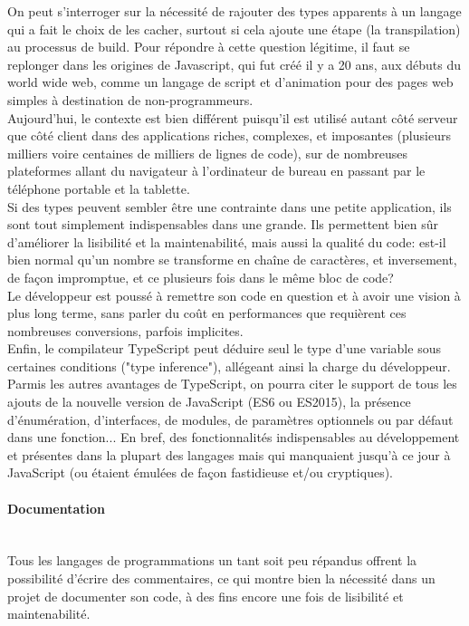 \documentclass[a4paper,french,12pt]{article}
\begin{document}
On peut s'interroger sur la nécessité de rajouter des types apparents à un langage qui a fait le choix de les cacher, surtout si cela ajoute une étape (la transpilation) au processus de build. Pour répondre à cette question légitime, il faut se replonger dans les origines de Javascript, qui fut créé il y a 20 ans, aux débuts du world wide web, comme un langage de script et d'animation pour des pages web simples à destination de non-programmeurs.~\\

	Aujourd'hui, le contexte est bien différent puisqu'il est utilisé autant côté serveur que côté client dans des applications riches, complexes, et imposantes (plusieurs milliers voire centaines de milliers de lignes de code), sur de nombreuses plateformes allant du navigateur à l'ordinateur de bureau en passant par le téléphone portable et la tablette.~\\
	
	Si des types peuvent sembler être une contrainte dans une petite application, ils sont tout simplement indispensables dans une grande.
	Ils permettent bien sûr d'améliorer la lisibilité et la maintenabilité, 
	mais aussi la qualité du code: est-il bien normal qu'un nombre se transforme en chaîne de caractères, et inversement, de façon impromptue, et ce plusieurs fois dans le même bloc de code? ~\\
	
	Le développeur est poussé à remettre son code en question et à avoir une vision à plus long terme, sans parler du coût en performances que requièrent ces nombreuses conversions, parfois implicites.~\\
	
	 Enfin, le compilateur TypeScript peut déduire seul le type d'une variable sous certaines conditions ("type inference"), allégeant ainsi la charge du développeur.~\\
	 
	 Parmis les autres avantages de TypeScript, on pourra citer le support de tous les ajouts de la nouvelle version de JavaScript (ES6 ou ES2015), la présence d'énumération, d'interfaces, de modules, de paramètres optionnels ou par défaut dans une fonction... En bref, des fonctionnalités indispensables au développement et présentes dans la plupart des langages mais qui manquaient jusqu'à ce jour à JavaScript (ou étaient émulées de façon fastidieuse et/ou cryptiques). 
	
	\paragraph{Documentation}~\\	
		Tous les langages de programmations un tant soit peu répandus offrent la possibilité d'écrire des commentaires, ce qui montre bien la nécessité dans un projet de documenter son code, à des fins encore une fois de lisibilité et maintenabilité.~\\	
		
\end{document}
